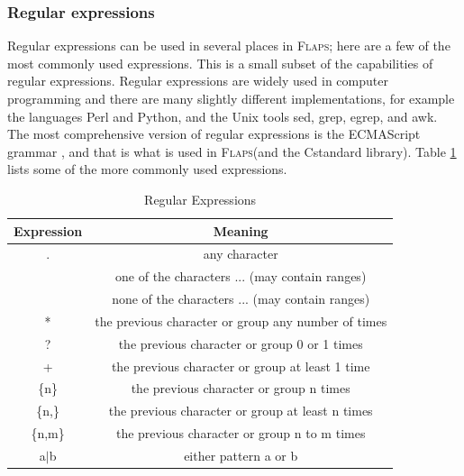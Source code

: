 \documentclass[11pt,openany,twoside]{book}
\numberwithin{equation}{section}		%
\def\Cpp{{C\nolinebreak[4]\hspace{-.05em}\raisebox{.4ex}{\tiny\bf ++}}\:}
\newcommand{\Cmd}[1]{{\sf #1}}
\newcommand{\Subst}[1]{{\small\sf #1}}
\newcommand{\Flaps}{\textsc{Flaps\:}}
\newcommand{\Tableref}[1]{Table \ref{#1}}
\begin{document}
\subsubsection{Regular expressions} \label{sect:regex}
Regular expressions can be used in several places in \Flaps;
here are a few of the most commonly used expressions.
This is a small subset of the capabilities of regular expressions.
Regular expressions are widely used in computer programming and
there are many slightly different implementations, for example
the languages Perl and Python, and the Unix tools \Cmd{sed},
\Cmd{grep}, \Cmd{egrep}, and \Cmd{awk}. The most comprehensive version of
regular expressions is the ECMAScript grammar \cite{ECMAScript},
and that is what is used in \Flaps (and the \Cpp standard library).
\Tableref{table:regex} lists some of the more commonly used expressions.
\begin{table}[ht]  %
\begin{tabular}{|c|c|} \hline
{\bf Expression} & {\bf Meaning}  \\ \hline
.    & any character \\ \hline
[...] & one of the characters ... (may contain ranges) \\ \hline
[\^\ \!\!...] & none of the characters ... (may contain ranges) \\ \hline
*    & the previous character or group any number of times \\ \hline
?    & the previous character or group 0 or 1 times \\ \hline
+    & the previous character or group at least 1 time \\ \hline
\{\Subst{n}\}  & the previous character or group \Subst{n} times \\ \hline
\{\Subst{n},\}  & the previous character or group at least \Subst{n} times \\ \hline
\{\Subst{n,m}\}  & the previous character or group \Subst{n} to \Subst{m} times \\ \hline
a$|$b    & either pattern a or b \\ \hline
\end{tabular}
\caption{Regular Expressions} \label{table:regex}
\end{table}
\end{document}
